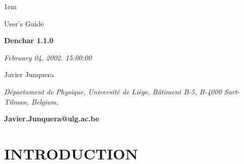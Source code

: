 %
%



\textheight 22cm
\textwidth 16cm
\oddsidemargin 1mm
\topmargin -15mm

\baselineskip=14pt
\parskip 5pt
\parindent 1em




\begin{titlepage}

\begin{center}

\vspace{1cm}

{\huge {\sc User's Guide}}

\vspace{4cm}

{\Huge {\bf {\sc Denchar} 1.1.0} }

\vspace{3cm}

{\Large {\it February 04, 2002. 15:00:00} }

\vspace{3cm}

{\Large Javier Junquera}

\vspace{5pt}

{\it D\'epartament de Physique, Universit\'e de Li\`ege,
B\^atiment B-5, B-4000 Sart-Tilman, Belgium},

\vspace{7mm}

\vspace{3cm}
{\bf Javier.Junquera@ulg.ac.be}

\end{center}

\end{titlepage}


\tableofcontents

\newpage



\section{INTRODUCTION}


